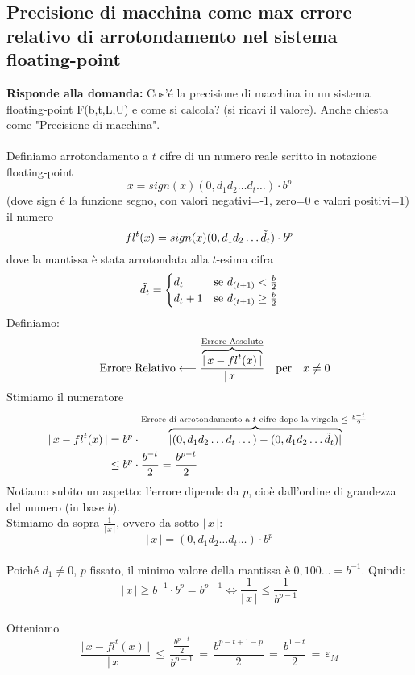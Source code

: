 \subsection{Precisione di macchina come max errore relativo di arrotondamento nel sistema floating-point}
\textbf{Risponde alla domanda:} Cos'é la precisione di macchina in un sistema floating-point F(b,t,L,U) e come si calcola? (si ricavi il valore). Anche chiesta come "Precisione di macchina".\\\\
Definiamo arrotondamento a $t$ cifre di un numero reale scritto in notazione floating-point \[ x = sign(x)(0,d_1 d_2 \dotsc d_t \dotsc) \cdot b^p \]
(dove sign é la funzione segno, con valori negativi=-1, zero=0 e valori positivi=1)\\
il numero \[ fl^t(x) = sign(x)(0,d_1 d_2 \dotsc \Tilde{d}_t) \cdot b^p \]
dove la mantissa è stata arrotondata alla $t$-esima cifra
\[\Tilde{d}_t = 
\begin{cases}
d_t & \text{se $d_{(t+1)} < \frac{b}{2}$} \\
d_t+1 & \text{se $d_{(t+1)} \ge \frac{b}{2}$}
\end{cases}
\]
Definiamo: \[ \quad \text{Errore Relativo} \longleftarrow \frac{\overbrace{\lvert \, x - fl^t(x) \, \rvert}^{\text {\underline{Errore Assoluto}}}}{\lvert \, x \, \rvert} \quad \text{per}\quad x \ne 0 \]
Stimiamo il numeratore
\[ \begin{split}
\lvert \, x - fl^t(x) \, \rvert & = b^p \cdot \overbrace{\lvert (0,d_1 d_2 \dotsc d_t \dotsc) - (0,d_1 d_2 \dotsc \Tilde{d}_t) \rvert}^{\text {Errore di arrotondamento a $t$ cifre dopo la virgola $ \le \frac{b^{-t}}{2}$ }} \\
& \le b^p \cdot \frac{b^{-t}}{2} = \frac{b^{p-t}}{2}
\end{split}\]
Notiamo subito un aspetto: l'errore dipende da $p$, cioè dall'ordine di grandezza del numero (in base $b$).\\
Stimiamo da sopra $ \frac{1}{\lvert \, x  \, \rvert} $, ovvero da sotto $\lvert \, x  \, \rvert$:
\[ \lvert \, x \, \rvert = (0,d_1 d_2 \dotsc d_t \dotsc ) \cdot b^p \] \\
Poiché $d_1 \ne 0$, $p$ fissato, il minimo valore della mantissa è $0,100 \dotsc = b^{-1}$. Quindi:
\[ \lvert \, x  \, \rvert \ge b^{-1} \cdot b^{p} = b^{p-1} \iff \frac{1}{\lvert \, x  \, \rvert} \le \frac{1}{b^{p-1}} \]\\
Otteniamo
\[ \frac{\lvert \, x - fl^t(x) \, \rvert}{\lvert \, x \, \rvert} \, \le \, \frac{\frac{b^{p-t}}{2}}{b^{p-1}} \,=\, \frac{b^{p-t+1-p}}{2} \,=\, \frac{b^{1-t}}{2} \,=\, \varepsilon_M\]